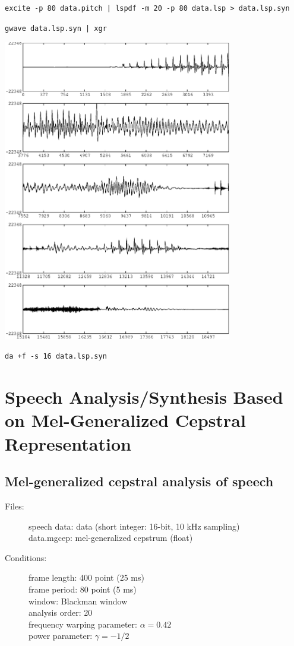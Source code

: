 \documentclass[a4paper]{article}
\begin{document}
\begin{verbatim}
excite -p 80 data.pitch | lspdf -m 20 -p 80 data.lsp > data.lsp.syn
\end{verbatim}

\begin{verbatim}
gwave data.lsp.syn | xgr
\end{verbatim}

\includegraphics[width=10cm]{data.lsp.syn.gwave.eps}

\begin{verbatim}
da +f -s 16 data.lsp.syn
\end{verbatim}

\section{Speech Analysis/Synthesis 
        Based on Mel-Generalized Cepstral Representation}

\subsection{Mel-generalized cepstral analysis of speech}

\begin{description}
\item[Files:]
   speech data: data (short integer: 16-bit, 10 kHz sampling)\\
   data.mgcep: mel-generalized cepstrum (float)
\item[Conditions:]
  frame length: 400 point (25 ms)\\
  frame period: 80 point (5 ms)\\
  window: Blackman window\\
  analysis order: 20\\
  frequency warping parameter: $\alpha = 0.42$\\
  power parameter:     $\gamma = -1/2$
\end{description}
\end{document}
